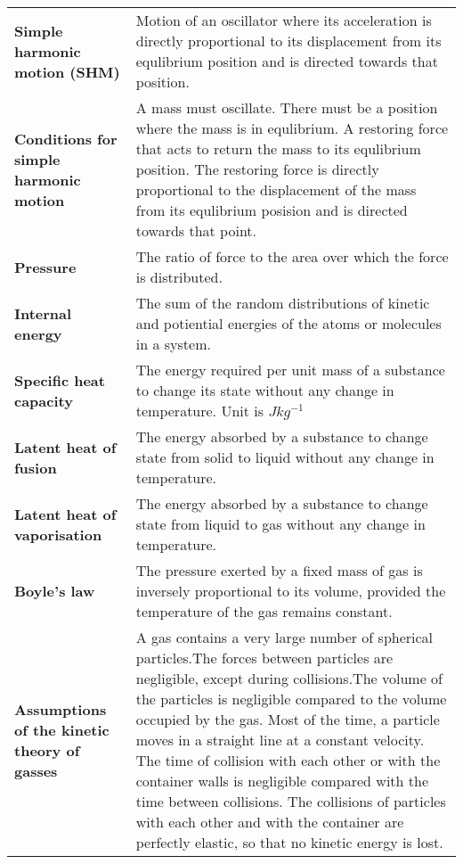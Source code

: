 \documentclass{article}
\begin{document}
\begin{longtable}{>{\bf\centering\arraybackslash}p{1in} 
  p{\textwidth-4\tabcolsep-1in}}
  Simple harmonic motion (SHM) & Motion of an oscillator where its acceleration
    is directly proportional to its displacement from its equlibrium position
    and is directed towards that position.\\
  Conditions for simple harmonic motion & A mass must oscillate. \newline
    \newline There must be a position where the mass is in equlibrium.\newline
    \newline A restoring force that acts to return the mass to its equlibrium
    position. The restoring force is directly proportional to the displacement
    of the mass from its equlibrium posision and is directed towards that point.
    \\ \midrule
  Pressure & The ratio of force to the area over which the force is distributed.
    \\\midrule
  Internal energy & The sum of the random distributions of kinetic and
    potiential energies of the atoms or molecules in a system.\\ \midrule
  Specific heat capacity & The energy required per unit mass of a substance to
    change its state without any change in temperature.\newline \newline
    Unit is $Jkg^{-1}$\\ \midrule
  Latent heat of fusion & The energy absorbed by a substance to change state
    from solid to liquid without any change in temperature. \\ \midrule
  Latent heat of vaporisation & The energy absorbed by a substance to change
    state from liquid to gas without any change in temperature. \\ \midrule
  Boyle's law & The pressure exerted by a fixed mass of gas is inversely
    proportional to its volume, provided the temperature of the gas remains
    constant.\\ \midrule
  Assumptions of the kinetic theory of gasses & A gas contains a very large
    number of spherical particles.\newline \newline The forces between particles
    are negligible, except during collisions.\newline \newline The volume of the
    particles is negligible compared to the volume occupied by the gas.\newline
    \newline Most of the time, a particle moves in a straight line at a constant
    velocity. The time of collision with each other or with the container walls
    is negligible compared with the time between collisions.\newline \newline
    The collisions of particles with each other and with the container are 
    perfectly elastic, so that no kinetic energy is lost.\\ \midrule
\end{longtable}
\end{document}
